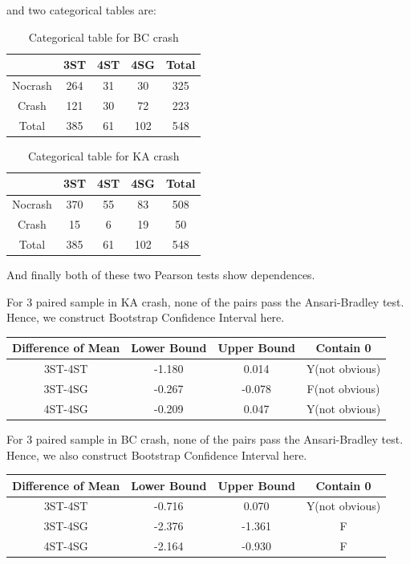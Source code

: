 \documentclass[11pt]{scrartcl} %
\begin{document}
and two categorical tables are:

\begin{table}[H]
\caption{Categorical table for BC crash}
\centering
\begin{tabular}{|c|c|c|c|c|}
\hline
      & 3ST & 4ST & 4SG & Total \\
\hline
Nocrash & 264 & 31  & 30 & 325 \\
\hline
Crash    & 121  & 30  & 72  & 223 \\
\hline
Total    & 385  & 61  & 102  & 548 \\
\hline
\end{tabular}
\end{table}

\begin{table}[H]
\caption{Categorical table for KA crash}
\centering
\begin{tabular}{|c|c|c|c|c|}
\hline
      & 3ST & 4ST & 4SG & Total \\
\hline
Nocrash & 370 & 55  & 83 & 508 \\
\hline
Crash    & 15  & 6  & 19  & 50 \\
\hline
Total    & 385  & 61  & 102  & 548 \\
\hline
\end{tabular}
\end{table}

And finally both of these two Pearson tests show dependences.

For 3 paired sample in KA crash, none of the pairs pass the Ansari-Bradley test. Hence, we construct Bootstrap Confidence Interval here.

\begin{table}[H]
\begin{tabular}{|c|c|c|c|}
\hline
Difference of Mean  & Lower Bound & Upper Bound & Contain 0 \\
\hline
3ST-4ST & -1.180 & 0.014 & Y(not obvious) \\
\hline
3ST-4SG   & -0.267  & -0.078  & F(not obvious) \\
\hline
4ST-4SG   & -0.209  & 0.047 & Y(not obvious) \\
\hline
\end{tabular}
\end{table}

For 3 paired sample in BC crash, none of the pairs pass the Ansari-Bradley test. Hence, we also construct Bootstrap Confidence Interval here.

\begin{table}[H]
\begin{tabular}{|c|c|c|c|}
\hline
Difference of Mean  & Lower Bound & Upper Bound & Contain 0 \\
\hline
3ST-4ST & -0.716 & 0.070 & Y(not obvious) \\
\hline
3ST-4SG   & -2.376  & -1.361  & F \\
\hline
4ST-4SG   & -2.164  & -0.930 & F \\
\hline
\end{tabular}
\end{table}
\end{document}
